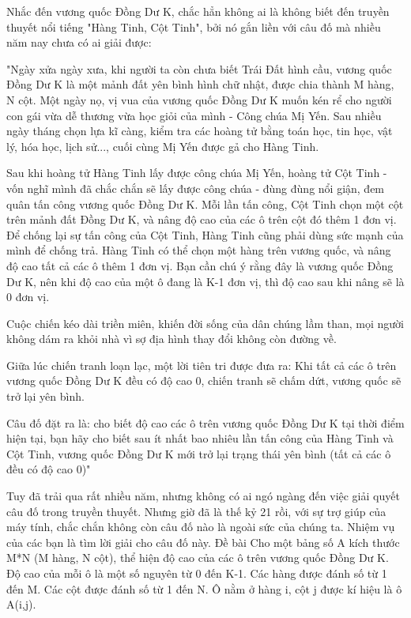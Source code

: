 Nhắc đến vương quốc Đồng Dư K, chắc hẳn không ai là không biết đến truyền thuyết nổi tiếng "Hàng Tinh, Cột Tinh", bởi nó gắn liền với câu đố mà nhiều năm nay chưa có ai giải được:

"Ngày xửa ngày xưa, khi người ta còn chưa biết Trái Đất hình cầu, vương quốc Đồng Dư K là một mảnh đất yên bình hình chữ nhật, được chia thành M hàng, N cột. Một ngày nọ, vị vua của vương quốc Đồng Dư K muốn kén rể cho người con gái vừa dễ thương vừa học giỏi của mình - Công chúa Mị Yến. Sau nhiều ngày tháng chọn lựa kĩ càng, kiểm tra các hoàng tử bằng toán học, tin học, vật lý, hóa học, lịch sử..., cuối cùng Mị Yến được gả cho Hàng Tinh.

Sau khi hoàng tử Hàng Tinh lấy được công chúa Mị Yến, hoàng tử Cột Tinh - vốn nghĩ mình đã chắc chắn sẽ lấy được công chúa - đùng đùng nổi giận, đem quân tấn công vương quốc Đồng Dư K. Mỗi lần tấn công, Cột Tinh chọn một cột trên mảnh đất Đồng Dư K, và nâng độ cao của các ô trên cột đó thêm 1 đơn vị. Để chống lại sự tấn công của Cột Tinh, Hàng Tinh cũng phải dùng sức mạnh của mình để chống trả. Hàng Tinh có thể chọn một hàng trên vương quốc, và nâng độ cao tất cả các ô thêm 1 đơn vị. Bạn cần chú ý rằng đây là vương quốc Đồng Dư K, nên khi độ cao của một ô đang là K-1 đơn vị, thì độ cao sau khi nâng sẽ là 0 đơn vị.

Cuộc chiến kéo dài triền miên, khiến đời sống của dân chúng lầm than, mọi người không dám ra khỏi nhà vì sợ địa hình thay đổi không còn đường về.

Giữa lúc chiến tranh loạn lạc, một lời tiên tri được đưa ra: Khi tất cả các ô trên vương quốc Đồng Dư K đều có độ cao 0, chiến tranh sẽ chấm dứt, vương quốc sẽ trở lại yên bình.

Câu đố đặt ra là: cho biết độ cao các ô trên vương quốc Đồng Dư K tại thời điểm hiện tại, bạn hãy cho biết sau ít nhất bao nhiêu lần tấn công của Hàng Tinh và Cột Tinh, vương quốc Đồng Dư K mới trở lại trạng thái yên bình (tất cả các ô đều có độ cao 0)"

Tuy đã trải qua rất nhiều năm, nhưng không có ai ngó ngàng đến việc giải quyết câu đố trong truyền thuyết. Nhưng giờ đã là thế kỷ 21 rồi, với sự trợ giúp của máy tính, chắc chắn không còn câu đố nào là ngoài sức của chúng ta. Nhiệm vụ của các bạn là tìm lời giải cho câu đố này.
Đề bài
Cho một bảng số A kích thước M*N (M hàng, N cột), thể hiện độ cao của các ô trên vương quốc Đồng Dư K. Độ cao của mỗi ô là một số nguyên từ 0 đến K-1. Các hàng được đánh số từ 1 đến M. Các cột được đánh số từ 1 đến N. Ô nằm ở hàng i, cột j được kí hiệu là ô A(i,j).

